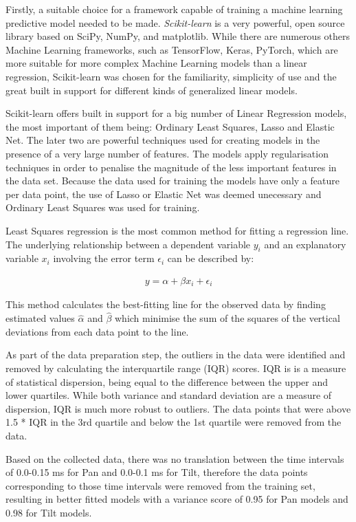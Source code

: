 \documentclass{l4proj}
\begin{document}
Firstly, a suitable choice for a framework capable of training a machine learning predictive model needed to be made. \textit{Scikit-learn} is a very powerful, open source library based on SciPy, NumPy, and matplotlib. While there are numerous others Machine Learning frameworks, such as TensorFlow, Keras, PyTorch, which are more suitable for more complex Machine Learning models than a linear regression, Scikit-learn was chosen for the familiarity, simplicity of use and the great built in support for different kinds of generalized linear models.



Scikit-learn offers built in support for a big number of Linear Regression models, the most important of them being: Ordinary Least Squares, Lasso and Elastic Net. The later two are powerful techniques used for creating models in the presence of a very large number of features. The models apply regularisation techniques in order to penalise the magnitude of the less important features in the data set. Because the data used for training the models have only a feature per data point, the use of Lasso or Elastic Net was deemed unecessary and Ordinary Least Squares was used for training. 

Least Squares regression is the most common method for fitting a regression line. The underlying relationship between a dependent variable $y_{i}$ and an explanatory variable $x_{i}$ involving the error term $\epsilon_{i}$ can be described by:

\begin{align}
y = \alpha + \beta x_{i} + \epsilon _{i}
\end{align}


This method calculates the best-fitting line for the observed data by finding estimated values $ \hat{\alpha} $ and $\hat{\beta}$ which minimise the sum of the squares of the vertical deviations from each data point to the line. 

As part of the data preparation step, the outliers in the data were identified and removed by calculating the interquartile range (IQR) scores. IQR is is a measure of statistical dispersion, being equal to the difference between the upper and lower quartiles. While both variance and standard deviation are a measure of dispersion, IQR is much more robust to outliers. The data points that  were above 1.5 * IQR in the 3rd quartile and below the 1st quartile were removed from the data. 

Based on the collected data, there was no translation between the time intervals of 0.0-0.15 ms for Pan and 0.0-0.1 ms for Tilt, therefore the data points corresponding to those time intervals were removed from the training set, resulting in better fitted models with a variance score of 0.95 for Pan models and 0.98 for Tilt models. 
\end{document}
